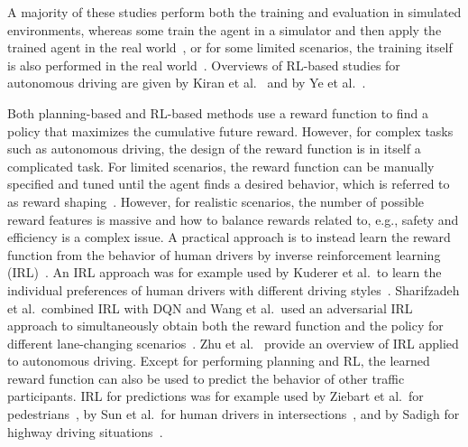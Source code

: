 A majority of these studies perform both the training and evaluation in simulated environments, whereas some train the agent in a simulator and then apply the trained agent in the real world~\cite{Pan2017, Bansal2019}, or for some limited scenarios, the training itself is also performed in the real world~\cite{Kendall2019}. 
Overviews of RL-based studies for autonomous driving are given by Kiran et al.~\cite{Kiran2021} and by Ye et al.~\cite{Ye2021}.

Both planning-based and RL-based methods use a reward function to find a policy that maximizes the cumulative future reward. However, for complex tasks such as autonomous driving, the design of the reward function is in itself a complicated task. For limited scenarios, the reward function can be manually specified and tuned until the agent finds a desired behavior, which is referred to as reward shaping~\cite{Ng1999}. However, for realistic scenarios, the number of possible reward features is massive and how to balance rewards related to, e.g., safety and efficiency is a complex issue. A practical approach is to instead learn the reward function from the behavior of human drivers by inverse reinforcement learning (IRL)~\cite{Ng2000}. An IRL approach was for example used by Kuderer et al.\ to learn the individual preferences of human drivers with different driving styles~\cite{Kuderer2015}. Sharifzadeh et al.\ combined IRL with DQN and Wang et al.\ used an adversarial IRL approach to simultaneously obtain both the reward function and the policy for different lane-changing scenarios~\cite{Sharifzadeh2016, Wang2019}. 
Zhu et al.~\cite{Zhu2021} provide an overview of IRL applied to autonomous driving.
Except for performing planning and RL, the learned reward function can also be used to predict the behavior of other traffic participants. IRL for predictions was for example used by Ziebart et al.\ for pedestrians~\cite{Ziebart2009}, by Sun et al.\ for human drivers in intersections~\cite{Sun2019}, and by Sadigh for highway driving situations~\cite{Sadigh2016}.

